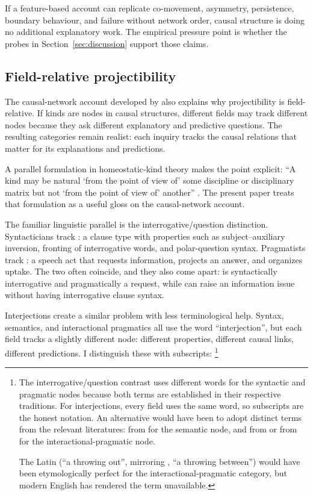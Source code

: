 \documentclass[12pt]{article}
\begin{document}
If a feature-based account can replicate co-movement, asymmetry,
persistence, boundary behaviour, and failure without network order,
causal structure is doing no additional explanatory work. The empirical
pressure point is whether the probes in Section~\ref{sec:discussion}
support those claims.

\subsection{Field-relative projectibility}\label{sec:fieldrelative-nodes}

The causal-network account developed by
\textcite{khalidi2013,khalidi2018nodes} also explains why
projectibility is field-relative. If kinds are nodes in causal
structures, different fields may track different nodes because they ask
different explanatory and predictive questions. The resulting categories
remain realist: each inquiry tracks the causal relations that matter for
its explanations and predictions.

A parallel formulation in homeostatic-kind theory makes the point
explicit: \enquote{A kind may be natural \enquote{from the point of view
of} some discipline or disciplinary matrix but not \enquote{from the
point of view of} another} \citep[150]{boyd1999}. The present paper
treats that formulation as a useful gloss on the causal-network account.

The familiar linguistic parallel is the interrogative/question
distinction. Syntacticians track : a clause type
with properties such as subject--auxiliary inversion, fronting of
interrogative words, and polar-question syntax. Pragmatists track :
a speech act that requests information, projects an answer, and
organizes uptake. The two often coincide, and they also come apart:
 is syntactically interrogative and
pragmatically a request, while  can
raise an information issue without having interrogative clause syntax.

Interjections create a similar problem with less terminological help.
Syntax, semantics, and interactional pragmatics all use the
word \enquote{interjection}, but each field tracks a slightly different
node: different properties, different causal links, different
predictions. I distinguish these with subscripts:%
\footnote{The interrogative/question contrast uses different words for
  the syntactic and pragmatic nodes because both terms are established
  in their respective traditions. For interjections,
  every field uses the same word, so subscripts are the honest notation.
  An alternative would have been to adopt distinct terms from the
  relevant literatures:  from \textcite{potts2007}
  for the semantic node, and  from
  \textcite{stivers2019} or  from
  \textcite{dingemanse2020} for the interactional-pragmatic node.

  The Latin
   (\enquote{a throwing out}, mirroring ,
  \enquote{a throwing between}) would have been etymologically perfect
  for the interactional-pragmatic category, but modern English has
  rendered the term unavailable.}
\end{document}
